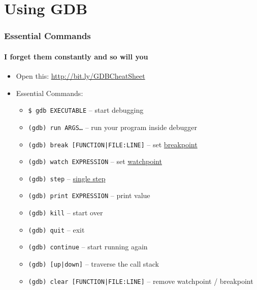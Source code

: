 \documentclass[aspectratio=169]{beamer}
\newcommand{\code}{\texttt}
\begin{document}
\section{Using GDB}
\begin{frame}
    \frametitle{Essential Commands}
    \framesubtitle{I forget them constantly and so will you}
    \begin{itemize}
        \item Open this: \url{http://bit.ly/GDBCheatSheet}
        \item Essential Commands:
        \begin{itemize}
            \item \code{\$ gdb EXECUTABLE} -- start debugging
            \item \code{(gdb) run ARGS\dots} -- run your program inside debugger
            \item \code{(gdb) break [FUNCTION|FILE:LINE]} -- set \underline{breakpoint}
            \item \code{(gdb) watch EXPRESSION} -- set \underline{watchpoint}
            \item \code{(gdb) step} -- \underline{single step}
            \item \code{(gdb) print EXPRESSION} -- print value
            \item \code{(gdb) kill} -- start over
            \item \code{(gdb) quit} -- exit
            \item \code{(gdb) continue} -- start running again
            \item \code{(gdb) [up|down]} -- traverse the call stack
            \item \code{(gdb) clear [FUNCTION|FILE:LINE]} -- remove watchpoint / breakpoint
        \end{itemize}
    \end{itemize}
    

\end{frame}
\end{document}
